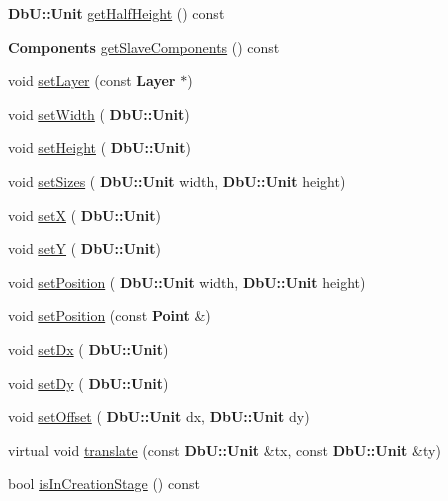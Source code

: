 \begin{DoxyCompactItemize}
\item 
\textbf{ Db\+U\+::\+Unit} \hyperlink{classKatabatic_1_1AutoContact_a3ab7b800879862100636b003a5d168f3}{get\+Half\+Height} () const
\item 
\textbf{ Components} \hyperlink{classKatabatic_1_1AutoContact_ad59f45aaefd5acc8fb9795d4c0e49a7f}{get\+Slave\+Components} () const
\item 
void \hyperlink{classKatabatic_1_1AutoContact_aad4271c35e0162c8a4d034dca07f5a4b}{set\+Layer} (const \textbf{ Layer} $\ast$)
\item 
void \hyperlink{classKatabatic_1_1AutoContact_a9a0ec0a0ac85f23cfad6c069ea8dade7}{set\+Width} (\textbf{ Db\+U\+::\+Unit})
\item 
void \hyperlink{classKatabatic_1_1AutoContact_a106f372cee0916ebb6544627e47bb58d}{set\+Height} (\textbf{ Db\+U\+::\+Unit})
\item 
void \hyperlink{classKatabatic_1_1AutoContact_a0284fcec9bd41b26648e7bef3d4f1952}{set\+Sizes} (\textbf{ Db\+U\+::\+Unit} width, \textbf{ Db\+U\+::\+Unit} height)
\item 
void \hyperlink{classKatabatic_1_1AutoContact_a154f993d0262c92bfc0dc95154faf794}{setX} (\textbf{ Db\+U\+::\+Unit})
\item 
void \hyperlink{classKatabatic_1_1AutoContact_ac862ce450a533f0544d2168b132ba165}{setY} (\textbf{ Db\+U\+::\+Unit})
\item 
void \hyperlink{classKatabatic_1_1AutoContact_a12d3bfdce07580db21b17cf87f912cc3}{set\+Position} (\textbf{ Db\+U\+::\+Unit} width, \textbf{ Db\+U\+::\+Unit} height)
\item 
void \hyperlink{classKatabatic_1_1AutoContact_a52707afec84391e898e01c75b2713d32}{set\+Position} (const \textbf{ Point} \&)
\item 
void \hyperlink{classKatabatic_1_1AutoContact_a2c83ac6a03bbac090a8ab120d62c6e44}{set\+Dx} (\textbf{ Db\+U\+::\+Unit})
\item 
void \hyperlink{classKatabatic_1_1AutoContact_a123478e15e2544598851d0e907212841}{set\+Dy} (\textbf{ Db\+U\+::\+Unit})
\item 
void \hyperlink{classKatabatic_1_1AutoContact_a9881d5e969669b641c5de4f4d94e5d15}{set\+Offset} (\textbf{ Db\+U\+::\+Unit} dx, \textbf{ Db\+U\+::\+Unit} dy)
\item 
virtual void \hyperlink{classKatabatic_1_1AutoContact_a9161f1e2832e5e141a13863223322aa5}{translate} (const \textbf{ Db\+U\+::\+Unit} \&tx, const \textbf{ Db\+U\+::\+Unit} \&ty)
\item 
bool \hyperlink{classKatabatic_1_1AutoContact_a77e5036ce0c3628f5bf65e729ba875ba}{is\+In\+Creation\+Stage} () const

\end{DoxyCompactItemize}

